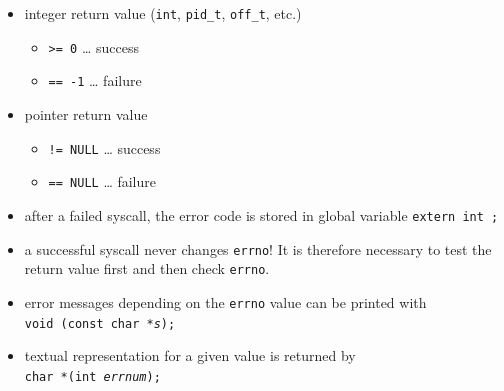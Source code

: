 \begin{slide}
\setlength{\baselineskip}{0.8\baselineskip}
\begin{itemize}
\item integer return value (\texttt{int}, \texttt{pid\_t},
\texttt{off\_t}, etc.)
    \begin{itemize}
    \item \texttt{>= 0} \dots{} success
    \item \texttt{== -1} \dots{} failure
    \end{itemize}
\item pointer return value
    \begin{itemize}
    \item \texttt{!= NULL} \dots{} success
    \item \texttt{== NULL} \dots{} failure
    \end{itemize}
\item after a failed syscall, the error code is stored in global variable
\texttt{extern int ;}
\item a successful syscall never changes \texttt{errno}! It is therefore
necessary to test the return value first and then check \texttt{errno}.
\item error messages depending on the \texttt{errno} value can be printed with\\
\texttt{void (const char *\emph{s});}
\item textual representation for a given value is returned by\\
\texttt{char *(int \emph{errnum});}
\end{itemize}
\end{slide}


